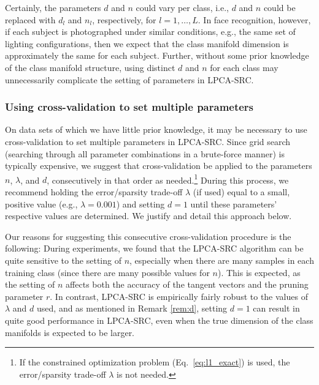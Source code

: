 \documentclass[review]{elsarticle}
\begin{document}
\begin{rem}
Certainly, the parameters $d$ and $n$ could vary per class, i.e., $d$ and $n$ could be replaced with $d_l$ and $n_l$, respectively, for $l=1,\ldots,L$. In face recognition, however, if each subject is photographed under similar conditions, e.g., the same set of lighting configurations, then we expect that the class manifold dimension is approximately the same for each subject. Further, without some prior knowledge of the class manifold structure, using distinct $d$ and $n$ for each class may unnecessarily complicate the setting of parameters in LPCA-SRC.
\end{rem}






\subsubsection{Using cross-validation to set multiple parameters} \label{sec:par_set}

On data sets of which we have little prior knowledge, it may be necessary to use cross-validation to set multiple parameters in LPCA-SRC. Since grid search (searching through all parameter combinations in a brute-force manner) is typically expensive, we suggest that cross-validation be applied to the parameters $n$, $\lambda$, and $d$, consecutively in that order as needed.\footnote{If the constrained optimization problem (Eq.~\eqref{eq:l1_exact}) is used, the error/sparsity trade-off $\lambda$ is not needed.} During this process, we recommend holding the error/sparsity trade-off $\lambda$ (if used) equal to a small, positive value (e.g., $\lambda=0.001$) and setting $d=1$ until these parameters' respective values are determined. We justify and detail this approach below.

Our reasons for suggesting this consecutive cross-validation procedure is the following: During experiments, we found that the LPCA-SRC algorithm can be quite sensitive to the setting of $n$, especially when there are many samples in each training class (since there are many possible values for $n$). This is expected, as the setting of $n$ affects both the accuracy of the tangent vectors and the pruning parameter $r$. In contrast, LPCA-SRC is empirically fairly robust to the values of $\lambda$ and $d$ used, and as mentioned in Remark \ref{rem:d}, setting $d=1$ can result in quite good performance in LPCA-SRC, even when the true dimension of the class manifolds is expected to be larger. 
\end{document}
